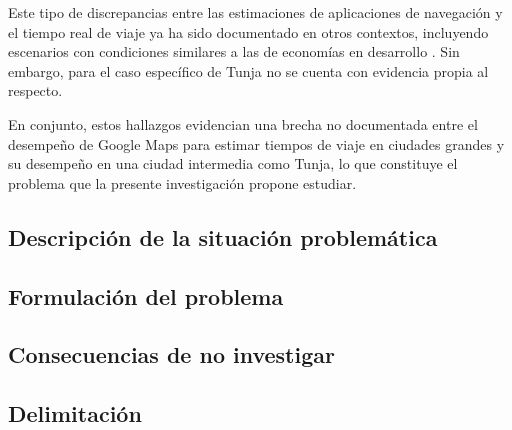 Este tipo de discrepancias entre las estimaciones de aplicaciones de navegación y el
tiempo real de viaje ya ha sido documentado en otros contextos, incluyendo escenarios
con condiciones similares a las de economías en desarrollo \cite{bastarianto2025}.
Sin embargo, para el caso específico de Tunja no se cuenta con evidencia propia al
respecto.

En conjunto, estos hallazgos evidencian una brecha no documentada entre el desempeño
de Google Maps para estimar tiempos de viaje en ciudades grandes y su desempeño en
una ciudad intermedia como Tunja, lo que constituye el problema que la presente
investigación propone estudiar.

\subsection{Descripción de la situación problemática}

\subsection{Formulación del problema}

\subsection{Consecuencias de no investigar}

\subsection{Delimitación}

